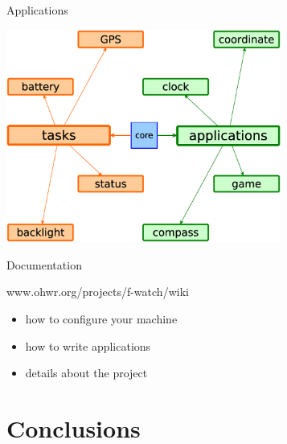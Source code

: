\documentclass[compress,red]{beamer}
\begin{document}
\begin{frame}{Applications}
   \begin{center}
    \includegraphics[height=7cm]{../pictures/sw-app.eps}
  \end{center}
\end{frame}


\begin{frame}
 \begin{center}
 \begin{figure}[h!]
\centering    
\end{figure}
 \end{center}
\end{frame}


\begin{frame}{Documentation}
  \begin{center}
      www.ohwr.org/projects/f-watch/wiki
  \end{center}
  \begin{itemize}
    \item how to configure your machine
    \item how to write applications
    \item details about the project
  \end{itemize}
\end{frame}

\section{Conclusions}
\end{document}
